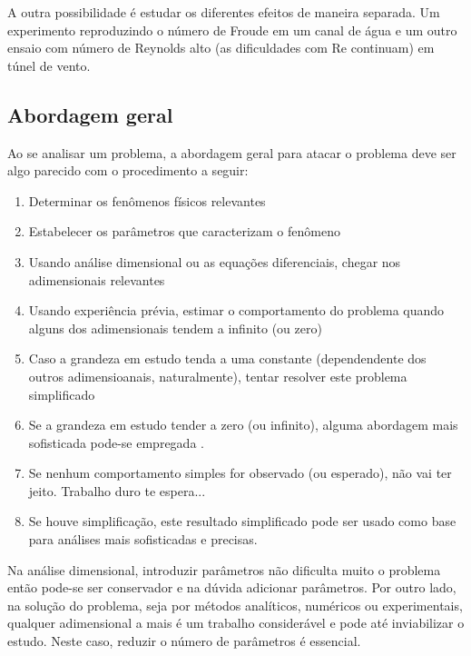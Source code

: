 A outra possibilidade é estudar os diferentes efeitos de maneira separada. Um experimento reproduzindo o número de Froude em um canal de água e um outro ensaio com número de Reynolds alto (as dificuldades com Re continuam) em túnel de vento.

  
\subsection{Abordagem geral}

Ao se analisar um problema, a abordagem geral para atacar o problema deve ser algo parecido com o procedimento a seguir:

\begin{enumerate}
\item Determinar os fenômenos físicos relevantes
\item Estabelecer os parâmetros que caracterizam o fenômeno
\item Usando análise dimensional ou as equações diferenciais, chegar nos adimensionais relevantes
\item Usando experiência prévia, estimar o comportamento do problema quando alguns dos adimensionais tendem a infinito (ou zero)
\item Caso a grandeza em estudo tenda a uma constante (dependendente dos outros adimensioanais, naturalmente), tentar resolver este problema simplificado
\item Se a grandeza em estudo tender a zero (ou infinito), alguma abordagem mais sofisticada pode-se empregada \cite{Barenblatt96}.
\item Se nenhum comportamento simples for observado (ou esperado), não vai ter jeito. Trabalho duro te espera...
\item Se houve simplificação, este resultado simplificado pode ser usado como base para análises mais sofisticadas e precisas.
\end{enumerate}

Na análise dimensional, introduzir parâmetros não dificulta muito o problema então pode-se ser conservador e na dúvida adicionar parâmetros. Por outro lado, na solução do problema, seja por métodos analíticos, numéricos ou experimentais, qualquer adimensional a mais é um trabalho considerável e pode até inviabilizar o estudo. Neste caso, reduzir o número de parâmetros é essencial.



